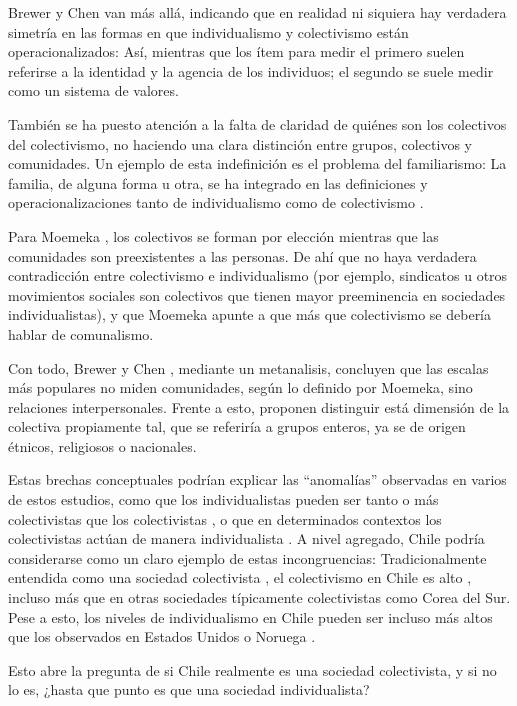 \documentclass[12pt,twoside]{templates/facsothesis}
\begin{document}
Brewer y Chen \citep{brewer2007} van más allá, indicando que en realidad ni siquiera hay verdadera simetría en las formas en que individualismo y colectivismo están operacionalizados: Así, mientras que los ítem para medir el primero suelen referirse a la identidad y la agencia de los individuos; el segundo se suele medir como un sistema de valores.

También se ha puesto atención a la falta de claridad de quiénes son los colectivos del colectivismo, no haciendo una clara distinción entre grupos, colectivos y comunidades. Un ejemplo de esta indefinición es el problema del familiarismo: La familia, de alguna forma u otra, se ha integrado en las definiciones y operacionalizaciones tanto de individualismo como de colectivismo \citep{oyserman2002}.

Para Moemeka \citeyearpar{moemeka1998}, los colectivos se forman por elección mientras que las comunidades son preexistentes a las personas. De ahí que no haya verdadera contradicción entre colectivismo e individualismo (por ejemplo, sindicatos u otros movimientos sociales son colectivos que tienen mayor preeminencia en sociedades individualistas), y que Moemeka apunte a que más que colectivismo se debería hablar de comunalismo.

Con todo, Brewer y Chen \citep{brewer2007}, mediante un metanalisis, concluyen que las escalas más populares no miden comunidades, según lo definido por Moemeka, sino relaciones interpersonales. Frente a esto, proponen distinguir está dimensión de la colectiva propiamente tal, que se referiría a grupos enteros, ya se de origen étnicos, religiosos o nacionales.

Estas brechas conceptuales podrían explicar las ``anomalías'' observadas en varios de estos estudios, como que los individualistas pueden ser tanto o más colectivistas que los colectivistas \citep{oyserman2002}, o que en determinados contextos los colectivistas actúan de manera individualista \citep{voronov2002}. A nivel agregado, Chile podría considerarse como un claro ejemplo de estas incongruencias: Tradicionalmente entendida como una sociedad colectivista \citep{rojas2008}, el colectivismo en Chile es alto \citep{oyserman2002}, incluso más que en otras sociedades típicamente colectivistas como Corea del Sur. Pese a esto, los niveles de individualismo en Chile pueden ser incluso más altos que los observados en Estados Unidos \citep{oyserman2002} o Noruega \citep{kolstad2009}.

Esto abre la pregunta de si Chile realmente es una sociedad colectivista, y si no lo es, ¿hasta que punto es que una sociedad individualista?
\end{document}
